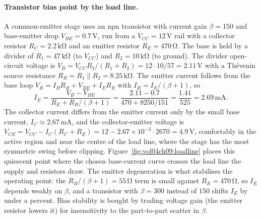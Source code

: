 \paragraph{Transistor bias point by the load line.}
A common-emitter stage uses an npn transistor with current gain $\beta = 150$
and base-emitter drop $V_{BE} = 0.7\,\si{\volt}$, run from a $V_{CC} =
12\,\si{\volt}$ rail with a collector resistor $R_{C} = 2.2\,\si{\kilo\ohm}$
and an emitter resistor $R_{E} = 470\,\si{\ohm}$. The base is held by a
divider of $R_{1} = 47\,\si{\kilo\ohm}$ (to $V_{CC}$) and $R_{2} = 10\,\si{
\kilo\ohm}$ (to ground). The divider open-circuit voltage is $V_{B} =
V_{CC}R_{2}/(R_{1}+R_{2}) = 12\cdot 10/57 = 2.11\,\si{\volt}$ with a
Th\'evenin source resistance $R_{B} = R_{1}\parallel R_{2} = 8.25\,\si{\kilo
\ohm}$. The emitter current follows from the base loop $V_{B} = I_{B}R_{B} +
V_{BE} + I_{E}R_{E}$ with $I_{B} = I_{E}/(\beta+1)$, so
\[
I_{E} = \frac{V_{B}-V_{BE}}{R_{E} + R_{B}/(\beta+1)}
= \frac{2.11-0.7}{470 + 8250/151}
= \frac{1.41}{525}
= 2.69\,\si{\milli\ampere}.
\]
The collector current differs from the emitter current only by the small
base current, $I_{C}\approx 2.67\,\si{\milli\ampere}$, and the collector-emitter voltage is
$V_{CE} = V_{CC} - I_{C}(R_{C}+R_{E}) = 12 - 2.67\times 10^{-3}\cdot 2670 =
4.9\,\si{\volt}$, comfortably in the active region and near the centre of the
load line, where the stage has the most symmetric swing before clipping.
Figure~\ref{fig:vol04ch09:loadline} places this quiescent point where the chosen
base-current curve crosses the load line the supply and resistors draw. The
emitter degeneration is what stabilises the operating point: the $R_{B}/
(\beta+1) = 55\,\si{\ohm}$ term is small against $R_{E} = 470\,\si{\ohm}$, so
$I_{E}$ depends weakly on $\beta$, and a transistor with $\beta = 300$ instead
of $150$ shifts $I_{E}$ by under a percent. Bias stability is bought by
trading voltage gain (the emitter resistor lowers it) for insensitivity to
the part-to-part scatter in $\beta$.



